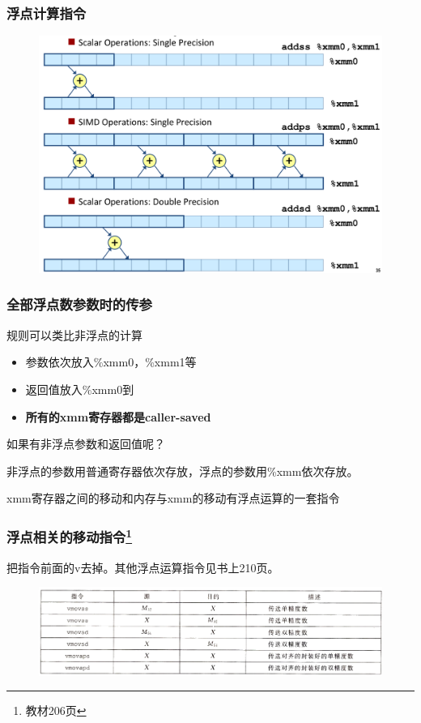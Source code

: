\documentclass[12pt,AutoFakeBold,aspectratio=169,mathserif]{beamer}
\begin{document}
    \begin{frame}
        \frametitle{浮点计算指令}
    
        \begin{figure}
            \includegraphics[width=.7\textwidth]{figures/fpu.png}
        \end{figure}
    
    \end{frame}

    \begin{frame}
        \frametitle{全部浮点数参数时的传参}
    
        规则可以类比非浮点的计算
        \begin{itemize}
            \item 参数依次放入\%xmm0，\%xmm1等
            \item 返回值放入\%xmm0到
            \item \textbf{所有的xmm寄存器都是caller-saved}
        \end{itemize}

        如果有非浮点参数和返回值呢？
        \pause

        非浮点的参数用普通寄存器依次存放，浮点的参数用\%xmm依次存放。

        xmm寄存器之间的移动和内存与xmm的移动有浮点运算的一套指令
    
    \end{frame}

    \begin{frame}
        \frametitle{浮点相关的移动指令\footnote{教材206页}}
    
        把指令前面的v去掉。其他浮点运算指令见书上210页。
        \begin{figure}
            \includegraphics[width=\textwidth]{figures/vmov.png}
        \end{figure}
    
    \end{frame}
\end{document}
